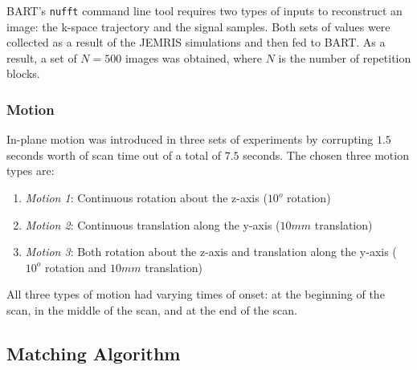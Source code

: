 \hfill

BART's \texttt{nufft} command line tool requires two types of inputs to reconstruct an image: the k-space trajectory and the signal samples.
Both sets of values were collected as a result of the JEMRIS simulations and then fed to BART.
As a result, a set of $N = 500$ images was obtained, where $N$ is the number of repetition blocks.

\hfill

\subsubsection{Motion}
\label{method:motion}

In-plane motion was introduced in three sets of experiments by corrupting $1.5$ seconds worth of scan time out of a total of $7.5$ seconds.
The chosen three motion types are:
\begin{enumerate}
    \item \textit{Motion 1}: Continuous rotation about the z-axis ($10^o$ rotation)
    \item \textit{Motion 2}: Continuous translation along the y-axis ($10mm$ translation)
    \item \textit{Motion 3}: Both rotation about the z-axis and translation along the y-axis ($10^o$ rotation and $10mm$ translation)
\end{enumerate}

All three types of motion had varying times of onset: at the beginning of the scan, in the middle of the scan, and at the end of the scan.




\hfill

\subsection{Matching Algorithm}
\label{method:matching}

